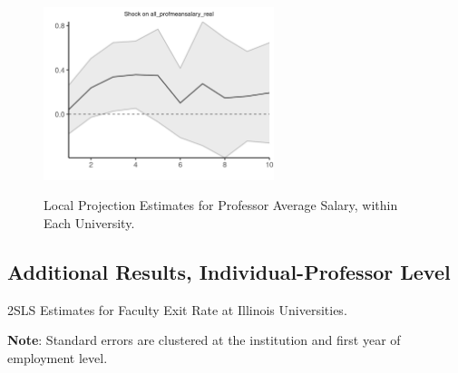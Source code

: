 \documentclass[notitlepage,12pt]{article}
\begin{document}
\begin{figure}[h!]
    \centering
    \caption{Local Projection Estimates for Professor Average Salary, within Each University.}
    \includegraphics[width=0.6\textwidth]{figures/all-salaries-lp.png}
    \label{fig:all-salaries-lp}
\end{figure}


\subsection{Additional Results, Individual-Professor Level}

\begin{table}[H]
    \onehalfspacing
    \centering
    \caption{2SLS Estimates for Faculty Exit Rate at Illinois Universities.}
    \makebox[\textwidth][c]{}
    \begin{flushleft}
        \footnotesize
        \textbf{Note}: Standard errors are clustered at the institution and first year of employment level.
    \end{flushleft}
    \label{tab:facultyleaving-shock-illinois}
\end{table}
\end{document}
